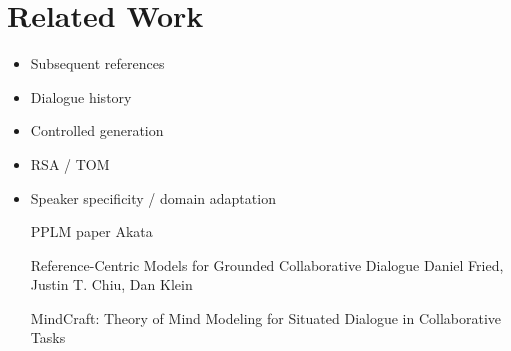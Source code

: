 
\section{Related Work}
\label{sec:related-work}

\begin{itemize}
\item Subsequent references \cite{gupta2005automatic,jordan2005learning,stoia-etal-2006-noun,viethen-etal-2011-generating}
\item Dialogue history \cite{brockmann2005modelling,buschmeier-etal-2009-alignment,stoyanchev-stent-2009-lexical,lopes2015rule,hu2016entrainment,dusek-jurcicek-2016-context}
\item Controlled generation \cite{nguyen2017plug,dathathri2020plug,keskar2019ctrl,ziegler2019finetuning}
\item RSA / TOM \cite{premack1978tom,corona2019modeling,andreas-klein-2016-reasoning,vedantam2017context,cohn-gordon-etal-2018-pragmatically}
\item Speaker specificity / domain adaptation

PPLM paper
Akata

Reference-Centric Models for Grounded Collaborative Dialogue
Daniel Fried, Justin T. Chiu, Dan Klein

MindCraft: Theory of Mind Modeling for Situated Dialogue in Collaborative Tasks

\end{itemize}


